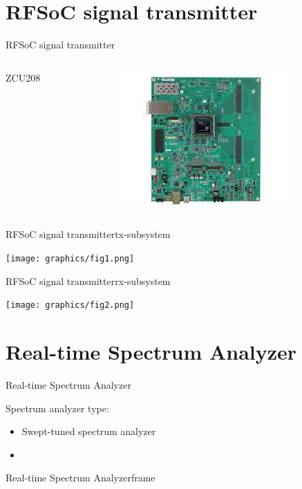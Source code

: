 \section{RFSoC signal transmitter}
\begin{frame}{RFSoC signal transmitter}{}
	\begin{columns}
		\begin{column}{0.4\textwidth}
			\begin{block}{ZCU208}
			\end{block}
		\end{column}
		\begin{column}{0.6\textwidth}
			\begin{center}
				\includegraphics[scale=0.65]{graphics/zcu208.jpeg}
			\end{center}
		\end{column}
	\end{columns}

\end{frame}
\begin{frame}{RFSoC signal transmitter}{tx-subsystem}
	\begin{center}
		\texttt{[image: graphics/fig1.png]}
	\end{center}	
\end{frame}
\begin{frame}{RFSoC signal transmitter}{rx-subsystem}
	\begin{center}
		\texttt{[image: graphics/fig2.png]}
	\end{center}	
\end{frame}
\section{Real-time Spectrum Analyzer}
\begin{frame}{Real-time Spectrum Analyzer}{}
\begin{block}{Spectrum analyzer type:}
		\begin{itemize}
		\item Swept-tuned spectrum analyzer 
		\item 
	\end{itemize}
		
	\end{block}

\end{frame}
\begin{frame}{Real-time Spectrum Analyzer}{frame}

\end{frame}
